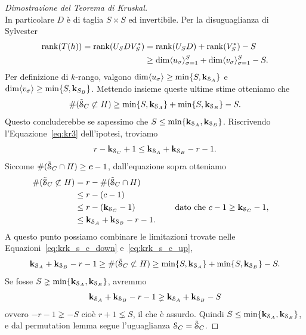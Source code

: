 \begin{proof}[Dimostrazione del Teorema di Kruskal]
\begin{equation*}
	\end{equation*}
	In particolare $ D $ è di taglia $ S\times S $ ed
	invertibile. Per la disuguaglianza di Sylvester~\cite[Pag. 12]{horn2012matrix}
	\begin{equation*}
		\begin{aligned}
			\rank(T(h)) = \rank(U_{S}DV_{S}^*) & = \rank(U_{S}D) + \rank(V_{S}^*) - S                                               \\
			                                   & \ge \dim \angb{u_\sigma}_{\sigma = 1}^S + \dim \angb{v_\sigma}_{\sigma = 1}^S - S.
		\end{aligned}
	\end{equation*}
	Per definizione di $ k $-rango, valgono $ \dim \angb{u_{\sigma}} \ge \min \{S, \krk{\s_A}\}  $ e
	$ \dim \angb{v_\sigma} \ge \min \{S, \krk{S_B}\}  $. Mettendo insieme queste ultime stime
	otteniamo che
	\begin{equation}
		\label{eq:krk_s_c_down}
		\#(\tilde{\mathcal{S}}_C \not\subset H) \ge \min \{S, \mathbf{k}_{\mathcal{S}_A}\}  + \min \{S, \mathbf{k}_{\mathcal{S}_B}\} - S.
	\end{equation}
	Questo concluderebbe se sapessimo che $ S \le \min \{\mathbf{k}_{\mathcal{S}_A}, \mathbf{k}_{\mathcal{S}_B}\}  $.
	Riscrivendo l'Equazione~\eqref{eq:kr3} dell'ipotesi, troviamo
	\begin{equation}
		\label{eq:krk_rewritten}
		r - \mathbf{k}_{\mathcal{S}_C} + 1 \le \mathbf{k}_{\mathcal{S}_A} + \mathbf{k}_{\mathcal{S}_B} - r - 1.
	\end{equation}
	Siccome $ \#(\tilde{\mathcal{S}}_C \cap H) \ge \bm{c} - 1 $, dall'equazione sopra otteniamo
	\begin{equation}
		\label{eq:krk_s_c_up}
		\begin{aligned}
			\#(\tilde{\mathcal{S}}_C \not\subset H) & = r - \#(\tilde{\mathcal{S}}_C \cap H)                                             \\
			                               & \le r - (c - 1)                                                           \\
			                               & \le r - (\mathbf{k}_{\mathcal{S}_C} - 1)             &  & \quad \text{ dato che } c-1 \ge
			\mathbf{k}_{\mathcal{S}_C} -1,                                                                                             \\
			                               & \le \mathbf{k}_{\mathcal{S}_A} + \mathbf{k}_{\mathcal{S}_B} - r - 1.
		\end{aligned}
	\end{equation}
	A questo punto possiamo combinare le limitazioni trovate nelle Equazioni~\eqref{eq:krk_s_c_down} e~\eqref{eq:krk_s_c_up},
	\begin{equation}
		\mathbf{k}_{\mathcal{S}_A} + \mathbf{k}_{\mathcal{S}_B} - r - 1 \ge \#(\tilde{\mathcal{S}}_C \not\subset H) \ge \min \{S, \mathbf{k}_{\mathcal{S}_A}\}  +
		\min \{S, \mathbf{k}_{\mathcal{S}_B}\} - S.
	\end{equation}
	Se fosse $ S \gneq  \min \{\mathbf{k}_{\mathcal{S}_A}, \mathbf{k}_{\mathcal{S}_B}\}  $, avremmo
	\begin{equation*}
		\mathbf{k}_{\mathcal{S}_A} + \mathbf{k}_{\mathcal{S}_B} - r -1 \gneq \mathbf{k}_{\mathcal{S}_A} + \mathbf{k}_{\mathcal{S}_B} - S
	\end{equation*}
	ovvero $  -r - 1 \gneq -S $ cioè $  r + 1 \lneq S $, il che è assurdo. Quindi $ S \le \min \{\mathbf{k}_{\mathcal{S}_A},
		\mathbf{k}_{\mathcal{S}_B}\}  $, e dal
	permutation lemma segue l'uguaglianza $ \mathcal{S}_C = \tilde{\mathcal{S}}_C $.


\end{proof}
